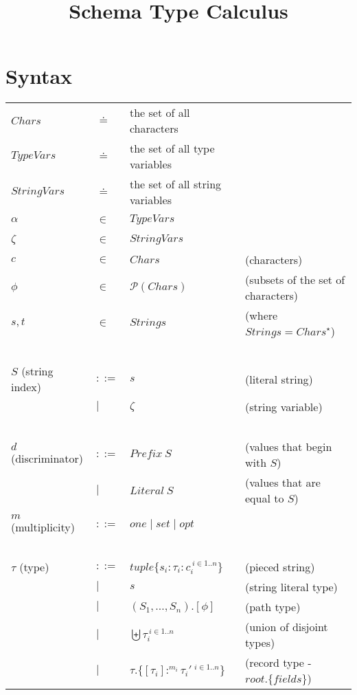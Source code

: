 \documentclass{article}
\title{Schema Type Calculus}
\begin{document}
\maketitle

\section*{Syntax}

\begin{tabular}{llll}
$\mathit{Chars}$ & $\doteq$ & the set of all characters \\
$\mathit{TypeVars}$ & $\doteq$ & the set of all type variables \\
$\mathit{StringVars}$ & $\doteq$ & the set of all string variables \\
$\alpha$ & $\in$ & $\mathit{TypeVars}$ & ~ \\
$\zeta$ & $\in$ & $\mathit{StringVars}$ & ~ \\
$c$ & $\in$ & $\mathit{Chars}$ & (characters) \\
$\phi$ & $\in$ & $\mathcal P(\mathit{Chars})$ & (subsets of the set of characters) \\
$s,t$ & $\in$ & $\mathit{Strings}$ & (where $\mathit{Strings} = \mathit{Chars}^{\star}$) \\~\\
$S$ (string index) & $::=$ & $s$ & (literal string) \\
                   & $\mid$ & $\zeta$ & (string variable) \\~\\
$d$ (discriminator) & $::=$  & $\mathit{Prefix}~S$ & (values that begin with $S$) \\
    & $\mid$ & $\mathit{Literal}~S$ & (values that are equal to $S$) \\
 & & \\
$m$ (multiplicity) & $::=$ & $\mathit{one} \mid \mathit{set} \mid \mathit{opt}$\\~\\
$\tau$ (type) & $::=$ & $\mathit{tuple} \{ s_i : \tau_i : c_i^{~i \in 1..n} \}$ & (pieced string) \\
       & $\mid$ & $s$ & (string literal type) \\
       & $\mid$ & $(S_1,\ldots,S_n).[\phi]$ & (path type) \\
       & $\mid$ & $\biguplus \tau_i^{~i \in 1..n}$ & (union of disjoint types) \\ 
       & $\mid$ & $\tau.\{[\tau_i] :^{m_i} \tau_i'~^{i \in 1..n}\}$ & (record type - $\mathit{root}.\{ fields \}$) \\ 

\end{tabular}
\end{document}
